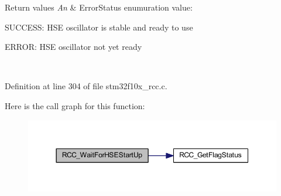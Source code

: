 \begin{DoxyRetVals}{Return values}
{\em An} & Error\+Status enumuration value\+:
\begin{DoxyItemize}
\item S\+U\+C\+C\+E\+SS\+: H\+SE oscillator is stable and ready to use
\item E\+R\+R\+OR\+: H\+SE oscillator not yet ready 
\end{DoxyItemize}\\
\hline
\end{DoxyRetVals}


Definition at line 304 of file stm32f10x\+\_\+rcc.\+c.

Here is the call graph for this function\+:
\nopagebreak
\begin{figure}[H]
\begin{center}
\leavevmode
\includegraphics[width=350pt]{group___r_c_c___exported___functions_gae0f15692614dd048ee4110a056f001dc_cgraph}
\end{center}
\end{figure}
